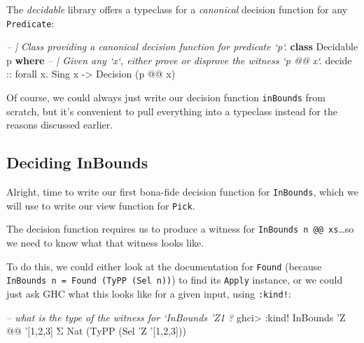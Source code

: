 \documentclass[]{article}
\newenvironment{Shaded}{}{}
\newcommand{\CommentTok}[1]{\textcolor[rgb]{0.38,0.63,0.69}{\textit{#1}}}
\newcommand{\DataTypeTok}[1]{\textcolor[rgb]{0.56,0.13,0.00}{#1}}
\newcommand{\DecValTok}[1]{\textcolor[rgb]{0.25,0.63,0.44}{#1}}
\newcommand{\FunctionTok}[1]{\textcolor[rgb]{0.02,0.16,0.49}{#1}}
\newcommand{\KeywordTok}[1]{\textcolor[rgb]{0.00,0.44,0.13}{\textbf{#1}}}
\newcommand{\NormalTok}[1]{#1}
\newcommand{\OtherTok}[1]{\textcolor[rgb]{0.00,0.44,0.13}{#1}}
\begin{document}
The \emph{decidable} library offers a typeclass for a \emph{canonical} decision
function for any \texttt{Predicate}:

\begin{Shaded}
\begin{Highlighting}[]
\CommentTok{-- | Class providing a canonical decision function for predicate `p`.}
\KeywordTok{class} \DataTypeTok{Decidable}\NormalTok{ p }\KeywordTok{where}
    \CommentTok{-- | Given any `x`, either prove or disprove the witness `p @@ x`.}
\OtherTok{    decide ::}\NormalTok{ forall x}\FunctionTok{.} \DataTypeTok{Sing}\NormalTok{ x }\OtherTok{->} \DataTypeTok{Decision}\NormalTok{ (p }\FunctionTok{@@}\NormalTok{ x)}
\end{Highlighting}
\end{Shaded}

Of course, we could always just write our decision function \texttt{inBounds}
from scratch, but it's convenient to pull everything into a typeclass instead
for the reasons discussed earlier.

\hypertarget{deciding-inbounds}{%
\subsection{Deciding InBounds}\label{deciding-inbounds}}

Alright, time to write our first bona-fide decision function for
\texttt{InBounds}, which we will use to write our view function for
\texttt{Pick}.

The decision function requires us to produce a witness for
\texttt{InBounds\ n\ @@\ xs}\ldots{}so we need to know what that witness looks
like.

To do this, we could either look at the documentation for \texttt{Found}
(because \texttt{InBounds\ n\ =\ Found\ (TyPP\ (Sel\ n))}) to find its
\texttt{Apply} instance, or we could just ask GHC what this looks like for a
given input, using \texttt{:kind!}:

\begin{Shaded}
\begin{Highlighting}[]
\CommentTok{-- what is the type of the witness for `InBounds 'Z1 ?}
\NormalTok{ghci}\FunctionTok{>} \FunctionTok{:}\NormalTok{kind}\FunctionTok{!} \DataTypeTok{InBounds}\NormalTok{ '}\DataTypeTok{Z} \FunctionTok{@@}\NormalTok{ '[}\DecValTok{1}\NormalTok{,}\DecValTok{2}\NormalTok{,}\DecValTok{3}\NormalTok{]}
\NormalTok{Σ }\DataTypeTok{Nat}\NormalTok{ (}\DataTypeTok{TyPP}\NormalTok{ (}\DataTypeTok{Sel}\NormalTok{ '}\DataTypeTok{Z}\NormalTok{ '[}\DecValTok{1}\NormalTok{,}\DecValTok{2}\NormalTok{,}\DecValTok{3}\NormalTok{]))}
\end{Highlighting}
\end{Shaded}
\end{document}
